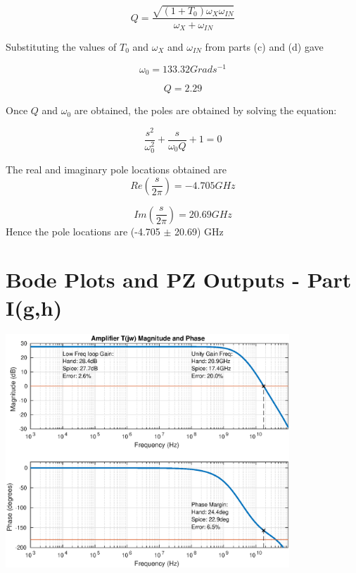 \documentclass[12pt,a4paper]{article}
\begin{document}
\begin{equation}
  Q = \frac{\sqrt{(1 + T_0) \omega_{X} \omega_{IN}}}{\omega_X + \omega_{IN}}
\end{equation}

Substituting the values of $T_0$ and $\omega_X$ and $\omega_{IN}$ from parts (c) and (d) gave 

\begin{equation}
  \omega_{0} = 133.32 G rad s^{-1}
\end{equation}

\begin{equation}
  Q = 2.29
\end{equation}

Once $Q$ and $\omega_0$ are obtained, the poles are obtained by solving the equation:

\begin{equation}
  \frac{s^{2}}{\omega_0^{2}} + \frac{s}{\omega_0 Q} + 1 = 0
\end{equation}

The real and imaginary pole locations obtained are 
\begin{equation}
  Re(\frac{s}{2 \pi}) = -4.705 GHz
\end{equation}

\begin{equation}
  Im(\frac{s}{2 \pi}) = 20.69 GHz
\end{equation}
Hence the pole locations are (-4.705 $\pm$ 20.69) GHz


\pagebreak




\section{Bode Plots and PZ Outputs - Part I(g,h)}

{\centering
	\includegraphics[width=0.8\textwidth]{plots/part_g.eps}
\par}
\end{document}
